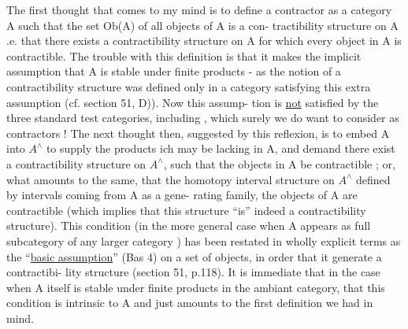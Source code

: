  The first thought that comes to my mind is to define a contractor
as a category A such that the set  Ob(A) of all objects of A is a con-%
tractibility structure on A\hand{,}  .e. that there exists
 a contractibility structure on A for which every object in
A is contractible. The trouble with this definition is that it makes
the implicit assumption that A is stable under finite products - as the
notion of a contractibility structure was defined only in a category
satisfying this extra assumption (cf. section 51, D)). Now this assump-%
tion is \uline{not} satisfied by the three standard test categories, including
\hand{$\Delta$}, which surely we do want to consider as contractors ! The next
thought then, suggested by this reflexion, is to embed A into $A^{\wedge}$ to
supply the products ich may be lacking in A, and demand there exist
a contractibility structure on $A^{\wedge}$, such that the objects in A  be
contractible ; or, what amounts to the same, that  the homotopy
interval structure on $A^{\wedge}$ defined by intervals coming from A as a gene-%
rating family,  the objects of
A are contractible (which implies that this structure ``is'' indeed a
contractibility structure). This condition (in the more general case
when A appears as  full subcategory of any larger category  ) has
been restated in wholly explicit terms as the ``\uline{basic assumption}''
(Bas 4) on a set of objects, in order that it generate a contractibi-%
lity structure (section 51, p.118). It is immediate that in the case
when A itself is stable under finite products in the ambiant category,
that this condition is intrinsic to A and just  amounts to the
first definition we had in mind.


